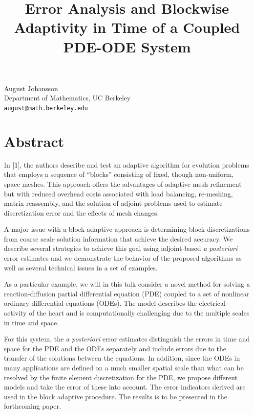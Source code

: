 \documentclass[article, A4, 11pt]{llncs}%
\begin{document}
\title{Error Analysis and Blockwise Adaptivity in Time of a Coupled PDE-ODE System}
 \author{} \institute{}
\maketitle
\begin{center}
{\large August  Johansson}\\
Department of Mathematics, UC Berkeley\\
{\tt august@math.berkeley.edu}
\end{center}

\section*{Abstract}
In [1], the authors describe and test an adaptive algorithm for evolution problems that employs a sequence of ``blocks'' consisting of fixed, though non-uniform, space meshes. This approach offers the advantages of adaptive mesh refinement but with reduced overhead costs associated with load balancing, re-meshing, matrix reassembly, and the solution of adjoint problems used to estimate discretization error and the effects of mesh changes.

A major issue with a block-adaptive approach is determining block discretizations from coarse scale solution information that achieve the desired accuracy. We describe several strategies to achieve this goal using adjoint-based {\em a posteriori} error estimates and we demonstrate the behavior of the proposed algorithms as well as several technical issues in a set of examples.

As a particular example, we will in this talk consider a novel method for solving a reaction-diffusion partial differential equation (PDE) coupled to a set of nonlinear ordinary differential equations (ODEs). The model describes the electrical activity of the heart and is computationally challenging due to the multiple scales in time and space.

For this system, the {\em a posteriori} error estimates distinguish the errors in time and space for the PDE and the ODEs separately and include errors due to the transfer of the solutions between the equations. In addition, since the ODEs in many applications are defined on a much smaller spatial scale than what can be resolved by the finite element discretization for the PDE, we propose different models and take the error of these into account. The error indicators derived are used in the block adaptive procedure. The results is to be presented in the forthcoming paper.
\end{document}

